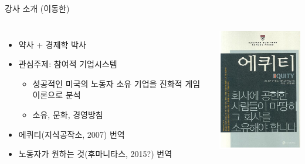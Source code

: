 \documentclass[final]{beamer}
\begin{document}
\begin{frame}[t]{강사 소개 (이동한)}
	\begin{columns}[c]
		\column{16em}
		\begin{itemize}
			\item 약사 + 경제학 박사
			\item 관심주제: 참여적 기업시스템
			\begin{itemize}
				\item 성공적인 미국의 노동자 소유 기업을 진화적 게임이론으로 분석 
				\item 소유, 문화, 경영방침 
			\end{itemize}
			\item 에퀴티(지식공작소, 2007) 번역
			\item 노동자가 원하는 것(후마니타스, 2015?) 번역
		\end{itemize}
		\column{14em}
		\includegraphics[width=12em]{equity1.png}
	\end{columns}
\end{frame}
\end{document}
